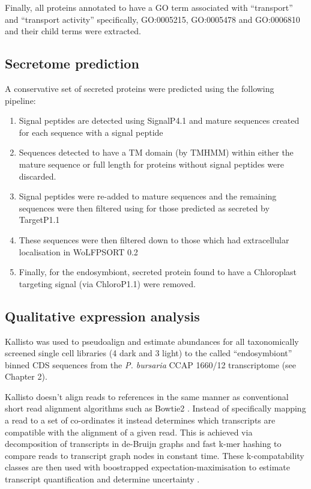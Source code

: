 Finally, all proteins annotated to have a GO term associated with ``transport'' and
``transport activity'' specifically, GO:0005215, GO:0005478 and GO:0006810 and their child
terms were extracted.  


\subsection{Secretome prediction}

A conservative set of secreted proteins were predicted 
using the following pipeline:
\begin{enumerate}
    \item Signal peptides are detected using SignalP4.1 and mature sequences
        created for each sequence with a signal peptide
    \item Sequences detected to have a TM domain (by TMHMM) within either the mature sequence or 
        full length for proteins without signal peptides were discarded.
    \item Signal peptides were re-added to mature sequences and the 
        remaining sequences were then filtered using for those predicted as secreted by TargetP1.1 
    \item These sequences were then filtered down to those which had extracellular
        localisation in WoLFPSORT 0.2 
    \item Finally, for the endosymbiont, secreted protein found to have a Chloroplast
        targeting signal (via ChloroP1.1) were removed.
\end{enumerate}

\subsection{Qualitative expression analysis}

Kallisto \citep{Bray2015} was used to pseudoalign and estimate abundances for 
all taxonomically screened single cell 
libraries (4 dark and 3 light) to the called ``endosymbiont''
binned CDS sequences from the \textit{P. bursaria} CCAP 1660/12
transcriptome (see Chapter 2).

Kallisto doesn't align reads to references in the same
manner as conventional short read alignment algorithms
such as Bowtie2 \citep{Langmead2012}.  Instead of specifically 
mapping a read to a set of co-ordinates it instead
determines which transcripts are compatible with the alignment 
of a given read.  This is achieved via decomposition of transcripts
in de-Bruijn graphs and fast k-mer hashing to compare reads to transcript
graph nodes in constant time.  These k-compatability classes are then used with
boostrapped expectation-maximisation to estimate transcript quantification and
determine uncertainty \citep{Bray2015}. 

